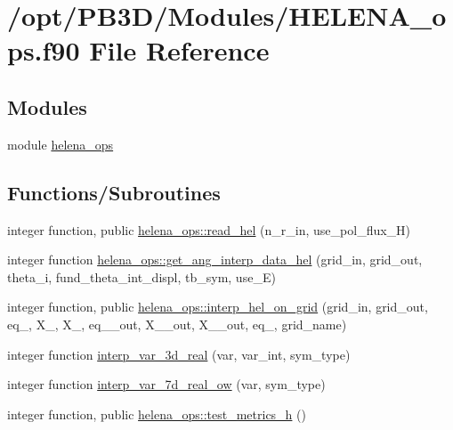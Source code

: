 \hypertarget{HELENA__ops_8f90}{}\section{/opt/\+P\+B3\+D/\+Modules/\+H\+E\+L\+E\+N\+A\+\_\+ops.f90 File Reference}
\label{HELENA__ops_8f90}
\subsection*{Modules}
\begin{DoxyCompactItemize}
\item 
module \hyperlink{namespacehelena__ops}{helena\+\_\+ops}
\end{DoxyCompactItemize}
\subsection*{Functions/\+Subroutines}
\begin{DoxyCompactItemize}
\item 
integer function, public \hyperlink{namespacehelena__ops_ae05ba1182eb002d93c27ca4ff7ab8cf2}{helena\+\_\+ops\+::read\+\_\+hel} (n\+\_\+r\+\_\+in, use\+\_\+pol\+\_\+flux\+\_\+H)
\item 
integer function \hyperlink{namespacehelena__ops_ab1329afe5af2ff92d96f4be15a096b38}{helena\+\_\+ops\+::get\+\_\+ang\+\_\+interp\+\_\+data\+\_\+hel} (grid\+\_\+in, grid\+\_\+out, theta\+\_\+i, fund\+\_\+theta\+\_\+int\+\_\+displ, tb\+\_\+sym, use\+\_\+E)
\item 
integer function, public \hyperlink{namespacehelena__ops_a7796861de18ae7ac9c3aa07a8628be38}{helena\+\_\+ops\+::interp\+\_\+hel\+\_\+on\+\_\+grid} (grid\+\_\+in, grid\+\_\+out, eq\+\_, X\+\_, X\+\_, eq\+\_\+\_\+out, X\+\_\+\_\+out, X\+\_\+\_\+out, eq\+\_, grid\+\_\+name)
\item 
integer function \hyperlink{HELENA__ops_8f90_a0480c2cb24b13d76286e1f2b0fe100a1}{interp\+\_\+var\+\_\+3d\+\_\+real} (var, var\+\_\+int, sym\+\_\+type)
\item 
integer function \hyperlink{HELENA__ops_8f90_a8229f4b89831a39793047106375555cf}{interp\+\_\+var\+\_\+7d\+\_\+real\+\_\+ow} (var, sym\+\_\+type)
\item 
integer function, public \hyperlink{namespacehelena__ops_a0f156b3653264fb016d6d311eb59114c}{helena\+\_\+ops\+::test\+\_\+metrics\+\_\+h} ()
\end{DoxyCompactItemize}


